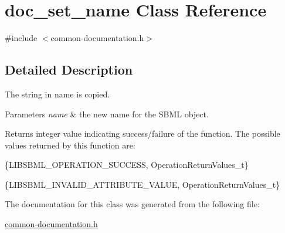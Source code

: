 \hypertarget{classdoc__set__name}{}\section{doc\+\_\+set\+\_\+name Class Reference}
\label{classdoc__set__name}


{\ttfamily \#include $<$common-\/documentation.\+h$>$}



\subsection{Detailed Description}
\begin{DoxyParagraph}{}

\end{DoxyParagraph}
The string in {\ttfamily name} is copied.


\begin{DoxyParams}{Parameters}
{\em name} & the new name for the S\+B\+ML object.\\
\hline
\end{DoxyParams}
\begin{DoxyReturn}{Returns}
integer value indicating success/failure of the function. The possible values returned by this function are\+: \begin{DoxyItemize}
\item \{L\+I\+B\+S\+B\+M\+L\+\_\+\+O\+P\+E\+R\+A\+T\+I\+O\+N\+\_\+\+S\+U\+C\+C\+E\+SS, Operation\+Return\+Values\+\_\+t\} \item \{L\+I\+B\+S\+B\+M\+L\+\_\+\+I\+N\+V\+A\+L\+I\+D\+\_\+\+A\+T\+T\+R\+I\+B\+U\+T\+E\+\_\+\+V\+A\+L\+UE, Operation\+Return\+Values\+\_\+t\} \end{DoxyItemize}

\end{DoxyReturn}


The documentation for this class was generated from the following file\+:\begin{DoxyCompactItemize}
\item 
\hyperlink{common-documentation_8h}{common-\/documentation.\+h}\end{DoxyCompactItemize}
